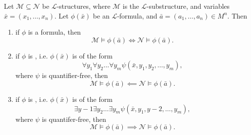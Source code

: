 \documentclass[notoc,notitlepage]{tufte-book}
\begin{document}
\begin{propo}\label{propo:structure_traversal_with_respect_to_quantifiers}
  Let $\mathcal{M} \subseteq \mathcal{N}$ be $\mathcal{L}$-structures, where $\mathcal{M}$ is the $\mathcal{L}$-substructure, and variables $\bar{x} = (x_1, \ldots, x_n)$. Let $\phi(\bar{x})$ be an $\mathcal{L}$-formula, and $\bar{a} = (a_1, \ldots, a_n) \in M^n$.
  Then
  \begin{enumerate}
    \item if $\phi$ is a  formula, then
      \begin{equation*}
        \mathcal{M} \models \phi(\bar{a}) \iff \mathcal{N} \models \phi(\bar{a}).
      \end{equation*}
    \item if $\phi$ is , i.e. $\phi(\bar{x})$ is of the form
      \begin{equation*}
        \forall y_1 \forall y_2 \hdots \forall y_m \psi(\bar{x}, y_1, y_2, \ldots, y_m),
      \end{equation*}
      where $\psi$ is quantifier-free, then
      \begin{equation*}
        \mathcal{M} \models \phi(\bar{a}) \impliedby \mathcal{N} \models \phi(\bar{a}).
      \end{equation*}
    \item if $\phi$ is , i.e. $\phi(\bar{x})$ is of the form
      \begin{equation*}
        \exists y-1 \exists y_2 \hdots \exists y_m \psi(\bar{x}, y_1, y-2, \ldots, y_m),
      \end{equation*}
      where $\psi$ is quantifer-free, then
      \begin{equation*}
        \mathcal{M} \models \phi(\bar{a}) \implies \mathcal{N} \models \phi(\bar{a}).
      \end{equation*}
  \end{enumerate}
\end{propo}
\end{document}
